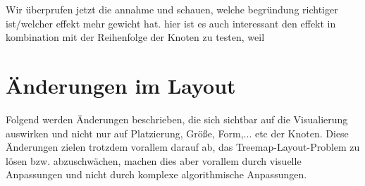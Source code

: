 Wir überprufen jetzt die annahme und schauen, welche begründung richtiger ist/welcher effekt mehr gewicht hat. 
hier ist es auch interessant den effekt in kombination mit der Reihenfolge der Knoten zu testen, weil %

\section{Änderungen im Layout} \label{sec:LayoutÄnderungen}
Folgend werden Änderungen beschrieben, die sich sichtbar auf die Visualierung auswirken und nicht nur auf Platzierung, Größe, Form,... etc der Knoten. Diese Änderungen zielen trotzdem vorallem darauf ab, das Treemap-Layout-Problem zu lösen bzw. abzuschwächen, machen dies aber vorallem durch visuelle Anpassungen und nicht durch komplexe algorithmische Anpassungen.

